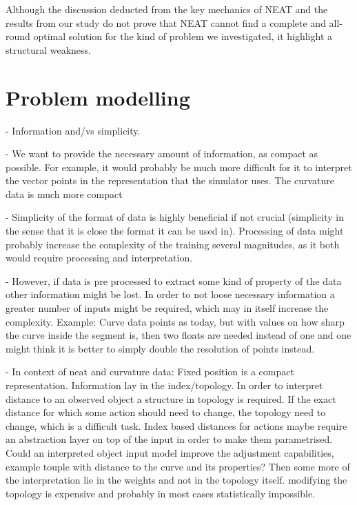 Although the discussion deducted from the key mechanics of NEAT and the results from our study do not prove that NEAT cannot find a complete and all-round optimal solution for the kind of problem we investigated, it highlight a structural weakness.



\section{Problem modelling}
- Information and/vs simplicity. 

- We want to provide the necessary amount of information, as compact as possible. For example, it would probably be much more difficult for it to interpret the vector points in the representation that the simulator uses. The curvature data is much more compact

- Simplicity of the format of data is highly beneficial if not crucial (simplicity in the sense that it is close the format it can be used in). Processing of data might probably increase the complexity of the training several magnitudes, as it both would require processing and interpretation.

- However, if data is pre processed to extract some kind of property of the data other information might be lost. In order to not loose necessary information a greater number of inputs might be required, which may in itself increase the complexity. Example: Curve data points as today, but with values on how sharp the curve inside the segment is, then two floats are needed instead of one and one might think it is better to simply double the resolution of points instead.

- In context of neat and curvature data: Fixed position is a compact representation. Information lay in the index/topology. In order to interpret distance to an observed object a structure in topology is required. If the exact distance for which some action should need to change, the topology need to change, which is a difficult task. Index based distances for actions maybe require an abstraction layer on top of the input in order to make them parametrised. Could an interpreted object input model improve the adjustment capabilities, example touple with distance to the curve and its properties? Then some more of the interpretation lie in the weights and not in the topology itself. modifying the topology is expensive and probably in most cases statistically impossible.


